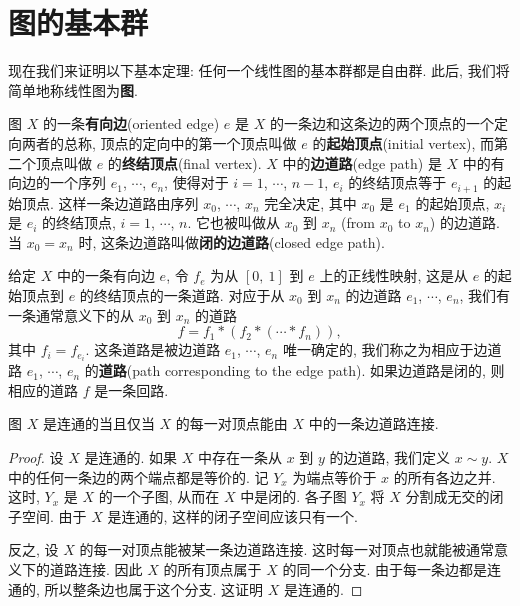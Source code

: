 \section{图的基本群}
\label{ch14-sec84}

现在我们来证明以下基本定理: 任何一个线性图的基本群都是自由群. 此后, 我们将简单地称线性图为\textbf{图}.

\begin{definition}
\label{definition:ch14-oriented-edge}
图 $X$ 的一条\textbf{有向边}(oriented edge) $e$ 是 $X$ 的一条边和这条边的两个顶点的一个定向两者的总称, 顶点的定向中的第一个顶点叫做 $e$ 的\textbf{起始顶点}(initial vertex), 而第二个顶点叫做 $e$ 的\textbf{终结顶点}(final vertex). $X$ 中的\textbf{边道路}(edge path) 是 $X$ 中的有向边的一个序列 $e_{1}$, $\cdots$, $e_{n}$, 使得对于 $i=1$, $\cdots$, $n-1$, $e_{i}$ 的终结顶点等于 $e_{i+1}$ 的起始顶点. 这样一条边道路由序列 $x_{0}$, $\cdots$, $x_{n}$ 完全决定, 其中 $x_{0}$ 是 $e_{1}$ 的起始顶点, $x_{i}$ 是 $e_{i}$ 的终结顶点, $i=1$, $\cdots$, $n$. 它也被叫做从 $x_{0}$ 到 $x_{n}$ (from $x_{0}$ to $x_{n}$) 的边道路. 当 $x_{0}=x_{n}$ 时, 这条边道路叫做\textbf{闭的边道路}(closed edge path).

给定 $X$ 中的一条有向边 $e$, 令 $f_{e}$ 为从 $[0,\ 1]$ 到 $e$ 上的正线性映射, 这是从 $e$ 的起始顶点到 $e$ 的终结顶点的一条道路. 对应于从 $x_{0}$ 到 $x_{n}$ 的边道路 $e_{1}$, $\cdots$, $e_{n}$, 我们有一条通常意义下的从 $x_{0}$ 到 $x_{n}$ 的道路
\[
f=f_{1}*(f_{2}*(\cdots*f_{n})),
\]
其中 $f_{i}=f_{e_{i}}$. 这条道路是被边道路 $e_{1}$, $\cdots$, $e_{n}$ 唯一确定的, 我们称之为相应于边道路 $e_{1}$, $\cdots$, $e_{n}$ 的\textbf{道路}(path corresponding to the edge path). 如果边道路是闭的, 则相应的道路 $f$ 是一条回路.
\end{definition}

\begin{lemma}[图连通的边道路判别]
\label{lemma:ch14-connected-edge-path}
图 $X$ 是连通的当且仅当 $X$ 的每一对顶点能由 $X$ 中的一条边道路连接.
\end{lemma}

\begin{proof}
设 $X$ 是连通的. 如果 $X$ 中存在一条从 $x$ 到 $y$ 的边道路, 我们定义 $x\sim y$. $X$ 中的任何一条边的两个端点都是等价的. 记 $Y_{x}$ 为端点等价于 $x$ 的所有各边之并. 这时, $Y_{x}$ 是 $X$ 的一个子图, 从而在 $X$ 中是闭的. 各子图 $Y_{x}$ 将 $X$ 分割成无交的闭子空间. 由于 $X$ 是连通的, 这样的闭子空间应该只有一个.

反之, 设 $X$ 的每一对顶点能被某一条边道路连接. 这时每一对顶点也就能被通常意义下的道路连接. 因此 $X$ 的所有顶点属于 $X$ 的同一个分支. 由于每一条边都是连通的, 所以整条边也属于这个分支. 这证明 $X$ 是连通的.
\end{proof}

